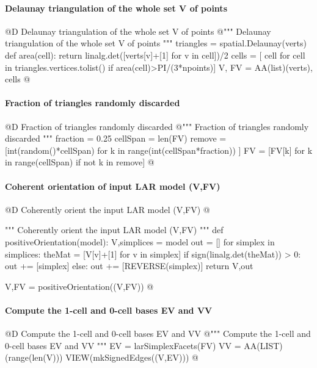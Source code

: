 \documentclass[11pt,oneside]{article}    %
\begin{document}
\paragraph{Delaunay triangulation of the whole set V of points}
@D Delaunay triangulation of the whole set V of points
@{""" Delaunay triangulation of the whole set V of points """
triangles = spatial.Delaunay(verts)
def area(cell): return linalg.det([verts[v]+[1] for v in cell])/2
cells = [ cell for cell in triangles.vertices.tolist() if area(cell)>PI/(3*npoints)]
V, FV = AA(list)(verts), cells
@}

\paragraph{Fraction of triangles randomly discarded}
@D Fraction of triangles randomly discarded
@{""" Fraction of triangles randomly discarded """
fraction = 0.25
cellSpan = len(FV)
remove = [int(random()*cellSpan) for k in range(int(cellSpan*fraction)) ]
FV = [FV[k] for k in range(cellSpan) if not k in remove]
@}

\paragraph{Coherent orientation of input LAR model (V,FV)}
@D Coherently orient the input LAR model (V,FV)
@{""" Coherently orient the input LAR model (V,FV) """
def positiveOrientation(model):
    V,simplices = model
    out = []
    for simplex in simplices:
        theMat = [V[v]+[1] for v in simplex]
        if sign(linalg.det(theMat)) > 0:  out += [simplex]
        else: out += [REVERSE(simplex)]
    return V,out

V,FV = positiveOrientation((V,FV))
@}

\paragraph{Compute the 1-cell and 0-cell bases EV and VV}
@D Compute the 1-cell and 0-cell bases EV and VV
@{""" Compute the 1-cell and 0-cell bases EV and VV """
EV = larSimplexFacets(FV)
VV = AA(LIST)(range(len(V)))
VIEW(mkSignedEdges((V,EV)))
@}
\end{document}

